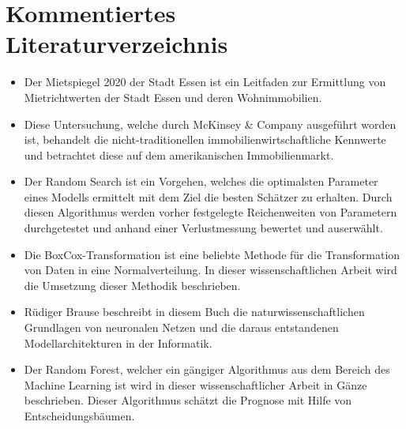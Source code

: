 \section{Kommentiertes Literaturverzeichnis}
\begin{itemize}
    \item Der Mietspiegel 2020 der Stadt Essen ist ein Leitfaden zur 
    Ermittlung von Mietrichtwerten der Stadt Essen und deren 
    Wohnimmobilien.
\end{itemize}

\begin{itemize}
    \item Diese Untersuchung, welche durch McKinsey \& Company ausgeführt
    worden ist, behandelt die nicht-traditionellen immobilienwirtschaftliche
    Kennwerte und betrachtet diese auf dem amerikanischen Immobilienmarkt. 
\end{itemize}

\begin{itemize}
    \item Der Random Search ist ein Vorgehen, welches die optimalsten
    Parameter eines Modells ermittelt mit dem Ziel die besten Schätzer
    zu erhalten. Durch diesen Algorithmus werden vorher festgelegte
    Reichenweiten von Parametern durchgetestet und anhand einer
    Verlustmessung bewertet und auserwählt.
\end{itemize}
\newpage
{}
\begin{itemize}
    \item Die BoxCox-Transformation ist eine beliebte Methode für die
    Transformation von Daten in eine Normalverteilung. In dieser
    wissenschaftlichen Arbeit wird die Umsetzung dieser Methodik 
    beschrieben.
\end{itemize}

\begin{itemize}
    \item Rüdiger Brause beschreibt in diesem Buch die 
    naturwissenschaftlichen Grundlagen von neuronalen Netzen und 
    die daraus entstandenen Modellarchitekturen in der Informatik.
\end{itemize}

\begin{itemize}
    \item Der Random Forest, welcher ein gängiger Algorithmus aus 
    dem Bereich des Machine Learning ist wird in dieser 
    wissenschaftlicher Arbeit in Gänze beschrieben. Dieser Algorithmus 
    schätzt die Prognose mit Hilfe von Entscheidungsbäumen.
\end{itemize}

